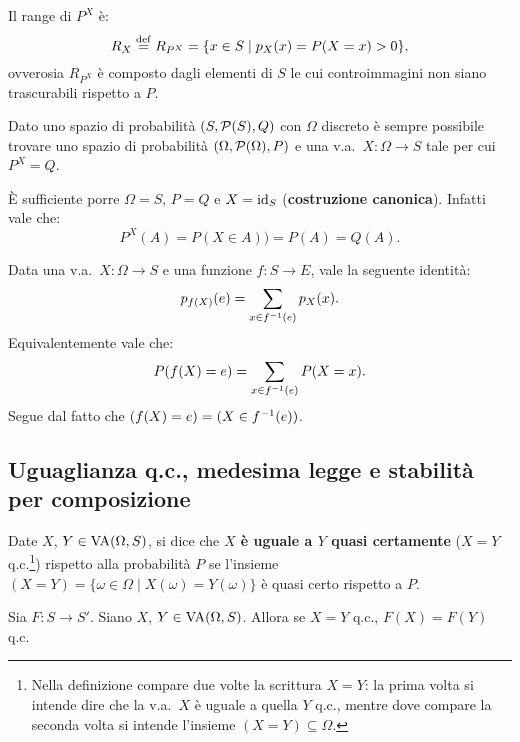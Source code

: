 \begin{multicols*}{2}
\begin{remark}
    Il range di $P^X$ è:
    \[ R_X \overset{\mathrm{def}}{=} R_{P^X} = \{x \in S \mid p_X(x) = P(X = x) > 0\}, \]
    ovverosia $R_{P^X}$ è composto dagli elementi di $S$ le cui
    controimmagini non siano trascurabili rispetto a $P$.
\end{remark}

\begin{remark}
    Dato uno spazio di probabilità $(S, \mathcal{P}(S), Q)$ con
    $\Omega$ discreto è sempre possibile trovare uno
    spazio di probabilità $(\Omega, \mathcal{P}(\Omega), P)$ e una
    v.a.~$X : \Omega \to S$ tale per cui $P^X = Q$. \smallskip

    È sufficiente porre $\Omega = S$, $P = Q$ e $X = \operatorname{id}_{S}$
    (\textbf{costruzione canonica}). Infatti vale che:
    \[
        P^X(A) = P(X \in A)) = P(A) = Q(A).
    \]
\end{remark}

\begin{proposition}
    Data una v.a.~$X : \Omega \to S$ e una funzione $f : S \to E$,
    vale la seguente identità:
    \[
        p_{f(X)}(e) = \sum_{x \in f^{-1}(e)} p_X(x).
    \]
    Equivalentemente vale che:
    \[
        P(f(X) = e) = \sum_{x \in f^{-1}(e)} P(X = x).
    \]
    Segue dal fatto che $(f(X) = e) = (X \in f^{-1}(e))$.
\end{proposition}

\subsection{Uguaglianza q.c., medesima legge e stabilità per composizione}
\label{sec:uguaglianza_qc}

\begin{definition}
    Date $X$, $Y \in \operatorname{VA}(\Omega, S)$, si dice che
    \textbf{$X$ è uguale a $Y$ quasi certamente} ($X = Y$ q.c.\footnote{
        Nella definizione compare due volte la scrittura $X = Y$: la prima
        volta si intende dire che la v.a.~$X$ è uguale a quella $Y$ q.c.,
        mentre dove compare la seconda volta si intende l'insieme $(X=Y) \subseteq \Omega$.
    }) rispetto
    alla probabilità $P$ se
    l'insieme $(X = Y) = \{\omega \in \Omega \mid X(\omega) = Y(\omega)\}$
    è quasi certo rispetto a $P$.
\end{definition}

\begin{proposition}
    Sia $F : S \to S'$. Siano $X$, $Y \in \operatorname{VA}(\Omega, S)$. Allora se
    $X = Y$ q.c., $F(X) = F(Y)$ q.c. \smallskip


\end{proposition}
\end{multicols*}
